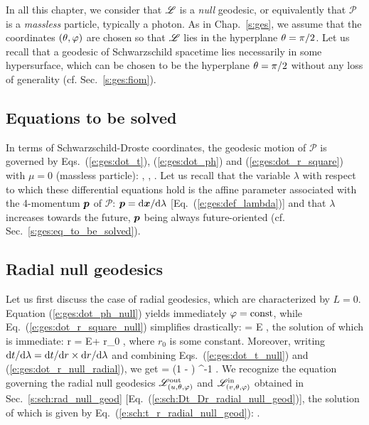 In all this chapter, we consider that $\mathscr{L}$ is a \emph{null}
geodesic, or equivalently that
$\mathscr{P}$ is a \emph{massless} particle, typically a photon.
As in Chap.~\ref{s:ges}, we assume that the coordinates $(\theta,\varphi)$ are chosen
so that $\mathscr{L}$ lies in the hyperplane $\theta=\pi/2$. Let us recall that
a geodesic of Schwarzschild spacetime lies necessarily in some hypersurface, which
can be chosen to be the hyperplane $\theta=\pi/2$ without any loss of generality
(cf. Sec.~\ref{s:ges:fiom}).

\subsection{Equations to be solved}

In terms of Schwarzschild-Droste coordinates, the geodesic motion of $\mathscr{P}$ is governed by Eqs.~(\ref{e:ges:dot_t}), (\ref{e:ges:dot_ph}) and (\ref{e:ges:dot_r_square})
with $\mu=0$ (massless particle):
\be \label{e:ges:dot_t_null}
    ,
\ee
\be \label{e:ges:dot_ph_null}
   ,
\ee
\be \label{e:ges:dot_r_square_null}
   .
\ee
Let us recall that the variable $\lambda$ with respect to which these differential equations
hold
is the affine parameter associated with the 4-momentum $\bm{p}$ of $\mathscr{P}$:
$\bm{p} = \mathrm{d}\bm{x}/\mathrm{d}\lambda$ [Eq.~(\ref{e:ges:def_lambda})] and that
$\lambda$ increases towards the future,
$\bm{p}$ being always future-oriented (cf. Sec.~\ref{s:ges:eq_to_be_solved}).

\subsection{Radial null geodesics} \label{s:gis:radial}

Let us first discuss the case of radial geodesics, which are characterized by $L=0$.
Equation (\ref{e:ges:dot_ph_null}) yields immediately $\varphi=\mathrm{const}$,
while Eq.~(\ref{e:ges:dot_r_square_null}) simplifies drastically:
\be \label{e:ges:dot_r_null_radial}
     = \pm E ,
\ee
the solution of which is immediate:
\be \label{e:ges:r_lambda_radial_null}
    r = \pm E\lambda + r_0 ,
\ee
where $r_0$ is some constant.
Moreover, writing $\mathrm{d} t/\mathrm{d}\lambda = \mathrm{d} t/\mathrm{d} r \times \mathrm{d} r/\mathrm{d}\lambda$
and combining Eqs.~(\ref{e:ges:dot_t_null}) and (\ref{e:ges:dot_r_null_radial}),
we get
\be \label{e:gis:dtdr_radial_geod}
     = \pm \left(1 -  \right) ^{-1} .
\ee
We recognize the equation governing the radial null geodesics
$\mathscr{L}^{\rm out}_{(u,\theta,\varphi)}$ and $\mathscr{L}^{\rm in}_{(v,\theta,\varphi)}$
obtained in
Sec.~\ref{s:sch:rad_null_geod} [Eq.~(\ref{e:sch:Dt_Dr_radial_null_geod})],
the solution of which is given by Eq.~(\ref{e:sch:t_r_radial_null_geod}):
\be
   .
\ee

